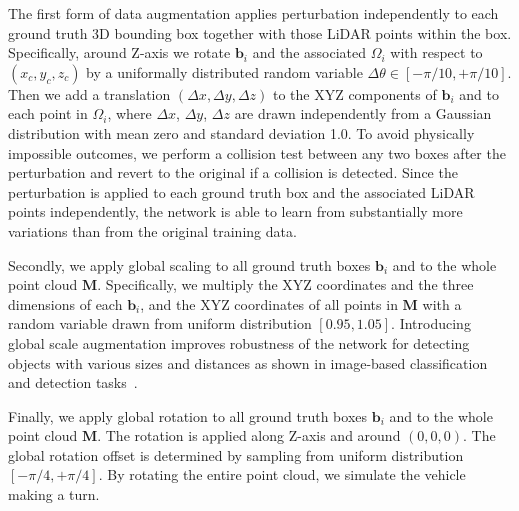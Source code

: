 \documentclass[10pt,twocolumn,letterpaper]{article}
\begin{document}
The first form of data augmentation applies perturbation independently to each ground truth 3D bounding box together with those LiDAR points within the box. Specifically, around Z-axis we rotate $\mathbf{b}_i$ and the associated $\Omega_i$ with respect to $(x_c, y_c, z_c)$ by a uniformally distributed random variable $\Delta\theta \in [-\pi/10, +\pi/10]$. Then we add a translation $(\Delta x, \Delta y, \Delta z)$ to the XYZ components of $\mathbf{b}_i$ and to each point in $\Omega_i$, where $\Delta x$, $\Delta y$, $\Delta z$ are drawn independently from a Gaussian distribution with mean zero and standard deviation 1.0. To avoid physically impossible outcomes, we perform a collision test between any two boxes after the perturbation and revert to the original if a collision is detected. Since the perturbation is applied to each ground truth box and the associated LiDAR points independently, the network is able to learn from substantially more variations than from the original training data.

Secondly, we apply global scaling to all ground truth boxes $\mathbf{b}_i$ and to the whole point cloud $\mathbf{M}$. Specifically, we multiply the XYZ coordinates and the three dimensions of each $\mathbf{b}_i$, and the XYZ coordinates of all points in $\mathbf{M}$ with a random variable drawn from uniform distribution $[0.95, 1.05]$. Introducing global scale augmentation improves robustness of the network for detecting objects with various sizes and distances as shown in image-based classification~\cite{REF:Simonyan14c, REF:journals/corr/Howard13} and detection tasks~\cite{REF:Girshick:2015, REF:ResNet2016}.

Finally, we apply global rotation to all ground truth boxes $\mathbf{b}_i$ and to the whole point cloud $\mathbf{M}$. The rotation is applied along Z-axis and around $(0, 0, 0)$. The global rotation offset is determined by sampling from uniform distribution $[-\pi/4, +\pi/4]$. By rotating the entire point cloud, we simulate the vehicle making a turn. 
\end{document}
